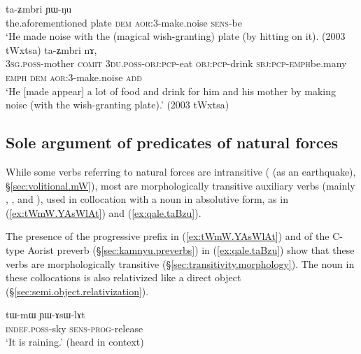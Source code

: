 \begin{exe}
\ex 
\begin{xlist}
\ex \label{ex:taZmbri}
  ta-ʑmbri ɲɯ-ŋu \\
 the.aforementioned plate \textsc{dem} \textsc{aor}:3\flobv{}-make.noise \textsc{sens}-be \\
\glt `He made noise with the (magical wish-granting) plate (by hitting on it). (2003 tWxtsa)
\ex \label{ex:taZmbri2}
  ta-ʑmbri nɤ, \\
 \textsc{3sg}.\textsc{poss}-mother \textsc{comit} \textsc{3du}.\textsc{poss}-\textsc{obj}:\textsc{pcp}-eat \textsc{obj}:\textsc{pcp}-drink \textsc{sbj}:\textsc{pcp}-\textsc{emph}\redp{}be.many \textsc{emph} \textsc{dem} \textsc{aor}:3\flobv{}-make.noise \textsc{add} \\
\glt `He [made appear] a lot of food and drink for him and his mother by making noise (with the wish-granting plate).' (2003 tWxtsa)
\end{xlist}
\end{exe}

\subsection{Sole argument of predicates of natural forces} \label{sec:absolutive.nature}
While some verbs referring to natural forces are intransitive ( (as an earthquake), §\ref{sec:volitional.mW}), most are morphologically transitive auxiliary verbs (mainly , ,  and ), used in collocation with a noun in absolutive form, as in (\ref{ex:tWmW.YAsWlAt}) and (\ref{ex:qale.taBzu}).

The presence of the progressive  prefix in (\ref{ex:tWmW.YAsWlAt}) and of the C-type Aorist  preverb (§\ref{sec:kamnyu.preverbs}) in (\ref{ex:qale.taBzu}) show that these verbs are morphologically transitive (§\ref{sec:transitivity.morphology}). The noun in these collocations is also relativized like a direct object (§\ref{sec:semi.object.relativization}).
 
\begin{exe}
\ex \label{ex:tWmW.YAsWlAt}
 \gll tɯ-mɯ ɲɯ-ɤsɯ-lɤt \\
 \textsc{indef}.\textsc{poss}-sky \textsc{sens}-\textsc{prog}-release \\
 \glt `It is raining.' (heard in context)
\end{exe}

